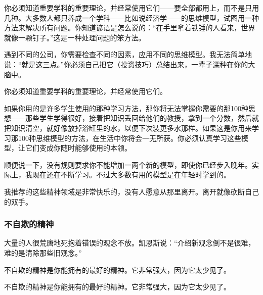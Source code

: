 你必须知道重要学科的重要理论，并经常使用它们——要全部都用上，而不是只用几种。大多数人都只养成一个学科——比如说经济学——的思维模型，试图用一种方法来解决所有问题。你知道谚语是怎么说的：“在手里拿着铁锤的人看来，世界就像一颗钉子。”这是一种处理问题的笨方法。
\par

遇到不同的公司，你需要检查不同的因素，应用不同的思维模型。我无法简单地说：“就是这三点。”你必须自己把它（投资技巧）总结出来，一辈子深种在你的大脑中。
\par

\begin{WisdomBox}
\par

你必须知道重要学科的重要理论，并经常使用它们。
\par
\end{WisdomBox}

如果你用的是许多学生使用的那种学习方法，那你将无法掌握你需要的那100种思想——那些学生学得很好，接着把知识丢回给他们的教授，拿到一个分数，然后就把知识清空，就好像放掉浴缸里的水，以便下次装更多水那样。如果这是你用来学习那100种思维模型的方法，在生活中你将会一无所获。你必须认真学习这些模型，让它们变成你随时能够使用的本领。
\par

顺便说一下，没有规则要求你不能增加一两个新的模型，即使你已经步入晚年。实际上，我现在还在不断学习。不过大多数有用的模型是在年轻时学到的。
\par

我推荐的这些精神领域是非常快乐的，没有人愿意从那里离开。离开就像砍断自己的双手。
\par

\subsubsection*{不自欺的精神}

大量的人很荒唐地死抱着错误的观念不放。凯恩斯说：“介绍新观念倒不是很难，难的是清除那些旧观念。”
\par

不自欺的精神是你能拥有的最好的精神。它非常强大，因为它太少见了。
\par

\begin{WisdomBox}
\par

不自欺的精神是你能拥有的最好的精神。它非常强大，因为它太少见了。
\par
\end{WisdomBox}

